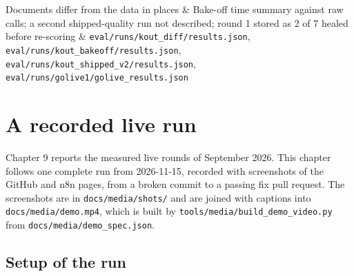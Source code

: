 \documentclass[11pt,a4paper]{report}
\begin{document}
\begin{longtable}
Documents differ from the data in places & Bake-off time summary against raw calls; a second shipped-quality run not described; round 1 stored as 2 of 7 healed before re-scoring & \texttt{eval/\allowbreak{}runs/\allowbreak{}kout\_\allowbreak{}diff/\allowbreak{}results.\allowbreak{}json}, \texttt{eval/\allowbreak{}runs/\allowbreak{}kout\_\allowbreak{}bakeoff/\allowbreak{}results.\allowbreak{}json}, \texttt{eval/\allowbreak{}runs/\allowbreak{}kout\_\allowbreak{}shipped\_\allowbreak{}v2/\allowbreak{}results.\allowbreak{}json}, \texttt{eval/\allowbreak{}runs/\allowbreak{}golive1/\allowbreak{}golive\_\allowbreak{}results.\allowbreak{}json} \\
\bottomrule
\end{longtable}

\chapter{A recorded live run}

Chapter 9 reports the measured live rounds of September 2026. This chapter follows one complete run from 2026-11-15, recorded with screenshots of the GitHub and n8n pages, from a broken commit to a passing fix pull request. The screenshots are in \texttt{docs/\allowbreak{}media/\allowbreak{}shots/\allowbreak{}} and are joined with captions into \texttt{docs/\allowbreak{}media/\allowbreak{}demo.\allowbreak{}mp4}, which is built by \texttt{tools/\allowbreak{}media/\allowbreak{}build\_\allowbreak{}demo\_\allowbreak{}video.\allowbreak{}py} from \texttt{docs/\allowbreak{}media/\allowbreak{}demo\_\allowbreak{}spec.\allowbreak{}json}.

\section{Setup of the run}
\end{document}
